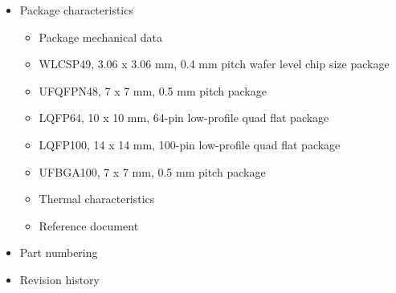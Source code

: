 \documentclass{article}
\begin{document}
\begin{itemize}
\begin{itemize}
        \item Embedded reference voltage 
        \item SD/SDIO MMC card host interface (SDIO) characteristics 
        \item RTC characteristics 
    \end{itemize}
    \item Package characteristics 
    \begin{itemize}
        \item Package mechanical data 
        \item WLCSP49, 3.06 x 3.06 mm, 0.4 mm pitch wafer level chip size package 
        \item UFQFPN48, 7 x 7 mm, 0.5 mm pitch package 
        \item LQFP64, 10 x 10 mm, 64-pin low-profile quad flat package 
        \item LQFP100, 14 x 14 mm, 100-pin low-profile quad flat package 
        \item UFBGA100, 7 x 7 mm, 0.5 mm pitch package 
        \item Thermal characteristics 
        \item Reference document 
    \end{itemize}
    \item Part numbering 
    \item Revision history 
\end{itemize}
\end{document}

